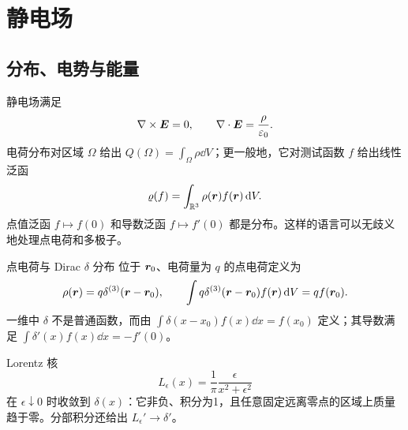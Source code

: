 \section{静电场}

\subsection{分布、电势与能量}

静电场满足
\[
 \nabla\times\bm{E}=0,
 \qquad \nabla\cdot\bm{E}=\frac\rho{\varepsilon_0}.
\]
电荷分布对区域 $\Omega$ 给出 $Q(\Omega)=\int_\Omega\rho\dd V$；更一般地，它对测试函数 $f$ 给出线性泛函
\[
 \varrho(f)=\int_{\mathbb R^3}\rho(\bm{r})f(\bm{r})\mathop{}\!\mathrm d V.
\]
点值泛函 $f\mapsto f(0)$ 和导数泛函 $f\mapsto f'(0)$ 都是分布。这样的语言可以无歧义地处理点电荷和多极子。

\begin{advdefinition}{点电荷与 Dirac $\delta$ 分布}\label{advA4:def:point-charge}
位于 $\bm{r}_0$、电荷量为 $q$ 的点电荷定义为
\[
 \rho(\bm{r})=q\delta^{(3)}(\bm{r}-\bm{r}_0),
 \qquad
 \int q\delta^{(3)}(\bm{r}-\bm{r}_0)f(\bm{r})\mathop{}\!\mathrm d V=qf(\bm{r}_0).
\]
一维中 $\delta$ 不是普通函数，而由
$\int\delta(x-x_0)f(x)\dd x=f(x_0)$ 定义；其导数满足
$\int\delta'(x)f(x)\dd x=-f'(0)$。
\end{advdefinition}

Lorentz 核
\[
 L_\epsilon(x)=\frac1\pi\frac\epsilon{x^2+\epsilon^2}
\]
在 $\epsilon\downarrow0$ 时收敛到 $\delta(x)$：它非负、积分为1，且任意固定远离零点的区域上质量趋于零。分部积分还给出 $L_\epsilon'\to\delta'$。

